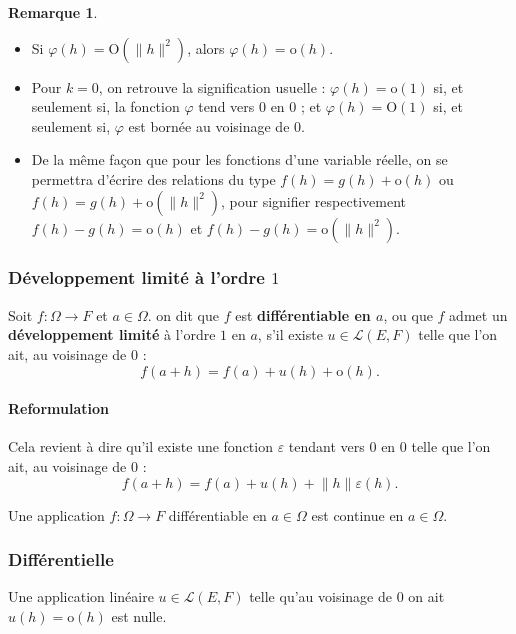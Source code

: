 \documentclass[french]{article}
\renewcommand{\o}{\text{o}}
\renewcommand{\O}{\text{O}}
\theoremstyle{plain}
\theoremstyle{definition}
\newtheorem*{rmq}{Remarque}
\theoremstyle{remark}
\begin{document}
\begin{rmq}
	\begin{itemize}
		\item Si $\varphi(h)=\O(\lVert h\rVert^2)$, alors $\varphi(h)=\o(h)$.
		\item Pour $k=0$, on retrouve la signification usuelle : $\varphi(h)=\o(1)$ si, et seulement si, la fonction $\varphi$ tend vers $0$ en $0$ ; et $\varphi(h)=\O(1)$ si, et seulement si, $\varphi$ est bornée au voisinage de $0$.
		\item De la même façon que pour les fonctions d'une variable réelle, on se permettra d'écrire des relations du type $f(h)=g(h)+\o(h)$ ou $f(h)=g(h)+\o(\lVert h\rVert^2)$, pour signifier respectivement $f(h)-g(h)=\o(h)$ et $f(h)-g(h)=\o(\lVert h\rVert^2)$.
	\end{itemize}
\end{rmq}

\subsubsection*{Développement limité à l'ordre $1$}

\begin{dfn}
	Soit $f:\Omega\to F$ et $a\in\Omega$. on dit que $f$ est \textbf{différentiable en $a$}, ou que $f$ admet un \textbf{développement limité} à l'ordre $1$ en $a$, s'il existe $u\in\mathcal{L}(E,F)$ telle que l'on ait, au voisinage de $0$ :
	$$f(a+h)=f(a)+u(h)+\o(h).$$ 
\end{dfn}

\paragraph{Reformulation} Cela revient à dire qu'il existe une fonction $\varepsilon$ tendant vers $0$ en $0$ telle que l'on ait, au voisinage de $0$ :
$$f(a+h)=f(a)+u(h)+\lVert h\rVert\varepsilon(h).$$

\begin{prop}%
	Une application $f:\Omega\to F$ différentiable en $a\in\Omega$ est continue en $a\in\Omega$.
\end{prop}

\subsubsection*{Différentielle}

\begin{lem}%
	Une application linéaire $u\in\mathcal{L}(E,F)$ telle qu'au voisinage de $0$ on ait $u(h)=\o(h)$ est nulle.
\end{lem}
\end{document}
